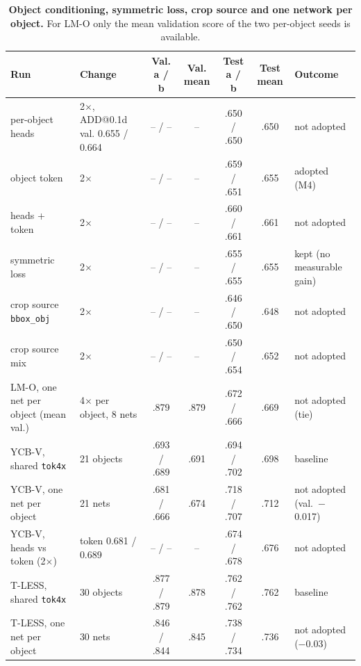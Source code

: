 \begin{table}[t]
  \centering
  \small
  \begin{tabular}{@{}llccccl@{}}
    \toprule
    Run & Change & Val. a / b & Val. mean & Test a / b & Test mean & Outcome \\
    \midrule
    per-object heads & 2$\times$, ADD@0.1d val. 0.655 / 0.664 & -- / -- & -- & .650 / .650 & .650 & not adopted \\
    object token & 2$\times$ & -- / -- & -- & .659 / .651 & .655 & adopted (M4) \\
    heads + token & 2$\times$ & -- / -- & -- & .660 / .661 & .661 & not adopted \\
    symmetric loss & 2$\times$ & -- / -- & -- & .655 / .655 & .655 & kept (no measurable gain) \\
    crop source \texttt{bbox\_obj} & 2$\times$ & -- / -- & -- & .646 / .650 & .648 & not adopted \\
    crop source mix & 2$\times$ & -- / -- & -- & .650 / .654 & .652 & not adopted \\
    LM-O, one net per object (mean val.) & 4$\times$ per object, 8 nets & .879 & .879 & .672 / .666 & .669 & not adopted (tie) \\
    YCB-V, shared \texttt{tok4x} & 21 objects & .693 / .689 & .691 & .694 / .702 & .698 & baseline \\
    YCB-V, one net per object & 21 nets & .681 / .666 & .674 & .718 / .707 & .712 & not adopted (val.\ $-$0.017) \\
    YCB-V, heads vs token (2$\times$) & token 0.681 / 0.689 & -- / -- & -- & .674 / .678 & .676 & not adopted \\
    T-LESS, shared \texttt{tok4x} & 30 objects & .877 / .879 & .878 & .762 / .762 & .762 & baseline \\
    T-LESS, one net per object & 30 nets & .846 / .844 & .845 & .738 / .734 & .736 & not adopted ($-$0.03) \\
    \bottomrule
  \end{tabular}
  \caption{\textbf{Object conditioning, symmetric loss, crop source and one network per object.} For LM-O only the mean validation score of the two per-object seeds is available.}
  \label{tab:cat_object}
\end{table}

